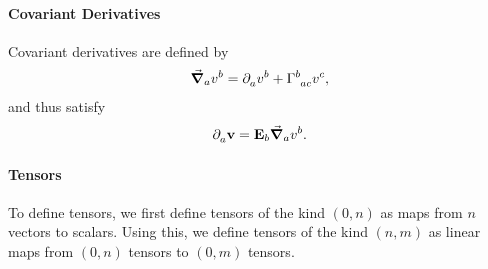\paragraph{Covariant Derivatives}
Covariant derivatives are defined by
\begin{align*}
	\dcov{a}{v^{b}} = \del{a}{v^{b}} + \chris{b}{a}{c}v^{c},
\end{align*}
and thus satisfy
\begin{align*}
	\partial^{}_{a}\vb{v} = \vb{E}_{b}\grad_{a}{v^{b}}.
\end{align*}

\paragraph{Tensors}
To define tensors, we first define tensors of the kind $(0, n)$ as maps from $n$ vectors to scalars. Using this, we define tensors of the kind $(n, m)$ as linear maps from $(0, n)$ tensors to $(0, m)$ tensors.
